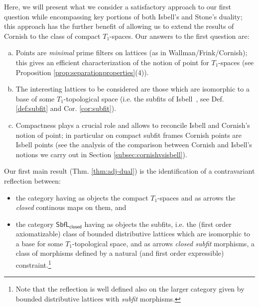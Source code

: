 \documentclass{article}
\theoremstyle{plain}
\theoremstyle{definition}
\theoremstyle{remark}
\newcommand{\bool}[1]{\mathsf{#1}}
\newcommand{\0}{\mathbbm 0}
\newcommand{\1}{\mathbbm 1}
\newcommand{\2}{\mathbbm 2}
\begin{document}
Here, we will present what we consider a satisfactory approach to our first question while encompassing key portions of both Isbell's and Stone's duality; this approach has the further benefit of allowing us to extend the results of Cornish to the class of compact $T_1$-spaces. Our %
answers to the first question are: 
\begin{enumerate}[(a)]
\item
Points are \emph{minimal} prime filters on lattices (as in Wallman/Frink/Cornish); this gives an efficient characterization of the notion of point for $T_1$-spaces (see Proposition \ref{prop:separationproperties}(4)).
\item
The interesting lattices to be considered are those which are isomorphic to a base of some $T_1$-topological space (i.e. the subfits of Isbell~\cite{Isbell}, see Def. \ref{def:subfit} and Cor. \ref{cor:subfit}).
\item Compactness plays a crucial role and allows to reconcile Isbell and Cornish's notion of point; in particular on compact subfit frames Cornish points are Isbell points (see the analysis of the comparison between Cornish and Isbell's notions we carry out in Section \ref{subsec:cornishvsisbell}).
\end{enumerate}

Our first main result (Thm. \ref{thm:adj-dual}) is the identification of a contravariant reflection between:
\begin{itemize} 
\item
the category having as objects the compact $T_1$-spaces and as arrows the \emph{closed} continous maps on them, and
\item
the category $\bool{SbfL}_\bool{closed}$ having as objects the subfits, i.e. the (first order axiomatizable) class of bounded distributive
lattices which are isomorphic to a base for some $T_1$-topological space, and as arrows \emph{closed subfit} morphisms, a class of morphisms defined by a natural (and first order expressible) constraint.\footnote{Note that the reflection is well defined also on the larger category given by bounded distributive lattices with \emph{subfit} morphisms.} 
\end{itemize}
\end{document}
